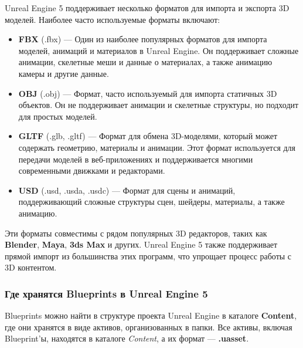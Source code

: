 Unreal Engine 5 поддерживает несколько форматов для импорта и экспорта 3D моделей. Наиболее часто используемые форматы включают:

\begin{itemize}
    \item \textbf{FBX} (.fbx) — Один из наиболее популярных форматов для импорта моделей, анимаций и материалов в Unreal Engine. Он поддерживает сложные анимации, скелетные меши и данные о материалах, а также анимацию камеры и другие данные.
    \item \textbf{OBJ} (.obj) — Формат, часто используемый для импорта статичных 3D объектов. Он не поддерживает анимации и скелетные структуры, но подходит для простых моделей.
    \item \textbf{GLTF} (.glb, .gltf) — Формат для обмена 3D-моделями, который может содержать геометрию, материалы и анимации. Этот формат используется для передачи моделей в веб-приложениях и поддерживается многими современными движками и редакторами.
    \item \textbf{USD} (.usd, .usda, .usdc) — Формат для сцены и анимаций, поддерживающий сложные структуры сцен, шейдеры, материалы, а также анимацию.
\end{itemize}

Эти форматы совместимы с рядом популярных 3D редакторов, таких как \textbf{Blender}, \textbf{Maya}, \textbf{3ds Max} и других. Unreal Engine 5 также поддерживает прямой импорт из большинства этих программ, что упрощает процесс работы с 3D контентом.

\subsubsection{Где хранятся Blueprints в Unreal Engine 5}

Blueprints можно найти в структуре проекта Unreal Engine в каталоге \textbf{Content}, где они хранятся в виде активов, организованных в папки. Все активы, включая Blueprint'ы, находятся в каталоге \textit{Content}, а их формат — \textbf{.uasset}.

